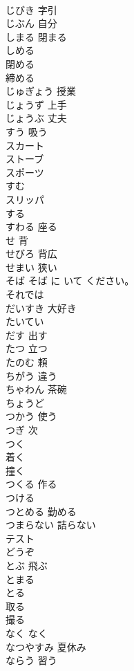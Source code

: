 \documentclass[8pt]{extreport}
\begin{document}
\begin{CJK}{UTF8}{min}
\\	じびき	字引
\\	じぶん	自分
\\	しまる	閉まる
\\	しめる	
\\	閉める 
\\	締める
\\	じゅぎょう	授業
\\	じょうず	上手
\\	じょうぶ	丈夫
\\	すう	吸う
\\	スカート	
\\	ストーブ	
\\	スポーツ	
\\	すむ	
\\	スリッパ	
\\	する	
\\	すわる	座る
\\	せ	背
\\	せびろ	背広
\\	せまい	狭い
\\	そば	そば に いて ください。 
\\	それでは	
\\	だいすき	大好き
\\	たいてい	
\\	だす	出す
\\	たつ	立つ
\\	たのむ	頼
\\	ちがう	違う
\\	ちゃわん	茶碗
\\	ちょうど	
\\	つかう	使う
\\	つぎ	次
\\	つく	
\\	着く 
\\	撞く
\\	つくる	作る
\\	つける	
\\	つとめる	勤める
\\	つまらない	詰らない
\\	テスト	
\\	どうぞ	
\\	とぶ	飛ぶ
\\	とまる	
\\	とる	
\\	取る 
\\	撮る
\\	なく	なく
\\	なつやすみ	夏休み
\\	ならう	習う

\end{CJK}
\end{document}
